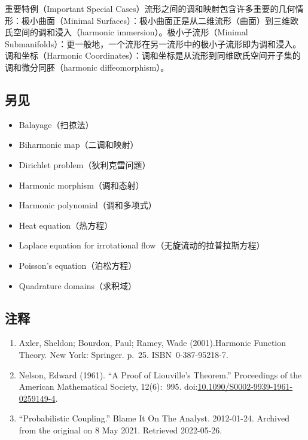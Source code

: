 重要特例（Important Special Cases）流形之间的调和映射包含许多重要的几何情形：极小曲面（Minimal Surfaces）：极小曲面正是从二维流形（曲面）到三维欧氏空间的调和浸入（harmonic immersion）。极小子流形（Minimal Submanifolds）：更一般地，一个流形在另一流形中的极小子流形即为调和浸入。调和坐标（Harmonic Coordinates）：调和坐标是从流形到同维欧氏空间开子集的调和微分同胚（harmonic diffeomorphism）。
\subsection{另见}
\begin{itemize}
  \item Balayage（扫掠法）
  \item Biharmonic map（二调和映射）
  \item Dirichlet problem（狄利克雷问题）
  \item Harmonic morphism（调和态射）
  \item Harmonic polynomial（调和多项式）
  \item Heat equation（热方程）
  \item Laplace equation for irrotational flow（无旋流动的拉普拉斯方程）
  \item Poisson's equation（泊松方程）
  \item Quadrature domains（求积域）
\end{itemize}
\subsection{注释}
\begin{enumerate}
  \item Axler, Sheldon; Bourdon, Paul; Ramey, Wade (2001).Harmonic Function Theory. New York: Springer. p.~25. ISBN~0-387-95218-7.
  \item Nelson, Edward (1961). “A Proof of Liouville’s Theorem.” Proceedings of the American Mathematical Society, 12(6):~995. doi:\href{https://doi.org/10.1090/S0002-9939-1961-0259149-4}{10.1090/S0002-9939-1961-0259149-4}.
  \item “Probabilistic Coupling.” Blame It On The Analyst. 2012-01-24. Archived from the original on 8 May 2021. Retrieved 2022-05-26.
\end{enumerate}
